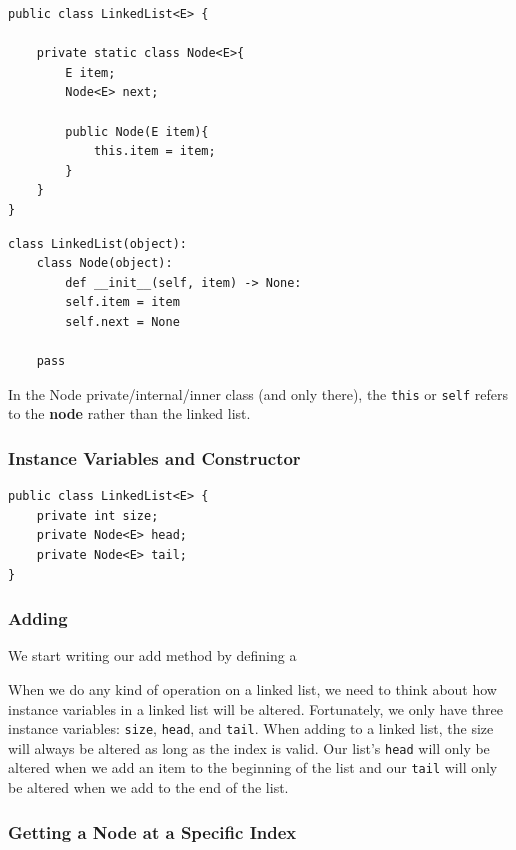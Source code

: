 \documentclass[10pt,a4paper]{book}
\begin{document}
\begin{verbatim}
public class LinkedList<E> { 
	
	private static class Node<E>{
		E item;
		Node<E> next;
		
		public Node(E item){
			this.item = item;
		}
	}
}
\end{verbatim}

\begin{verbatim}
class LinkedList(object):
	class Node(object):
		def __init__(self, item) -> None:
		self.item = item
		self.next = None

	pass
\end{verbatim}


In the Node private/internal/inner class (and only there), the \texttt{this} or \texttt{self} refers to the \textbf{node} rather than the linked list.





\subsubsection{Instance Variables and Constructor}


\begin{verbatim}
public class LinkedList<E> { 
	private int size;
	private Node<E> head;
	private Node<E> tail;
}
\end{verbatim}

\subsubsection{Adding}
We start writing our add method by defining a 


When we do any kind of operation on a linked list, we need to think about how instance variables in a linked list will be altered. 
Fortunately, we only have three instance variables: \texttt{size}, \texttt{head}, and \texttt{tail}.
When adding to a linked list, the size will always be altered as long as the index is valid.
Our list's \texttt{head} will only be altered when we add an item to the beginning of the list and our \texttt{tail} will only be altered when we add to the end of the list.



\subsubsection{Getting a Node at a Specific Index}
\end{document}

